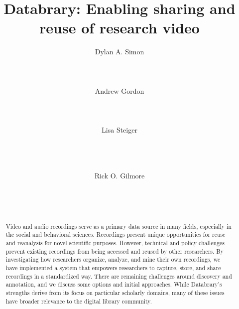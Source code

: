 \documentclass{sig-alternate}
\begin{document}

\title{Databrary: Enabling sharing and reuse of research video}


\author{
\alignauthor
Dylan A. Simon\\
	\\
	\\
	\\
\alignauthor
Andrew Gordon\\
	\\
	\\
	\\
\alignauthor
Lisa Steiger\\
	\\
	\\
	\\
\and
Rick O. Gilmore\\
	\\
	\\
	\\
}

\maketitle

\begin{abstract}
Video and audio recordings serve as a primary data source in many fields, especially in the social and behavioral sciences.
Recordings present unique opportunities for reuse and reanalysis for novel scientific purposes.
However, technical and policy challenges prevent existing recordings from being accessed and reused by other researchers.
By investigating how researchers organize, analyze, and mine their own recordings, we have implemented a system that empowers researchers to capture, store, and share recordings in a standardized way.
There are remaining challenges around discovery and annotation, and we discuss some options and initial approaches.
While Databrary's strengths derive from its focus on particular scholarly domains, many of these issues have broader relevance to the digital library community.
\end{abstract}
\end{document}
